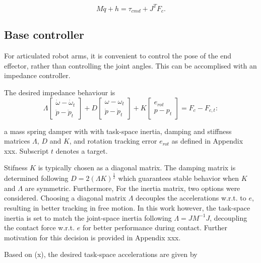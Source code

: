 \documentclass[a4paper, 10pt, conference]{ieeeconf}
\begin{document}
    \begin{equation}
    M\ddot{q}+h=\tau_{cmd}+J^TF_c.
    \end{equation}

    \subsection{Base controller}
    For articulated robot arms, it is convenient to control the pose of the end effector, rather than controlling the joint angles. This can be accomplised with an impedance controller.

    The desired impedance behaviour is
    \begin{equation}
     \Lambda \begin{bmatrix} \dot{\omega} - \dot{\omega}_{t} \\ \ddot{p} - \ddot{p}_{t} \end{bmatrix} + D \begin{bmatrix} {\omega} - {\omega}_{t} \\ \dot{p} - \dot{p}_{t} \end{bmatrix}  + K \begin{bmatrix} e_{rot} \\ {p} - {p}_{t} \end{bmatrix} = F_c-F_{c,t}:
     \end{equation} 

    a mass spring damper with with task-space inertia, damping and stiffness matrices $\Lambda$, $D$ and $K$, and rotation tracking error $e_{rot}$ as defined in Appendix xxx. Subscript $t$ denotes a target.

    Stifness $K$ is typically chosen as a diagonal matrix. The damping matrix is determined following $D = 2(\Lambda K)^{\frac{1}{2}}$ which guarantees stable behavior when $K$ and $\Lambda$ are symmetric. Furthermore, For the inertia matrix, two options were considered. Choosing a diagonal matrix $\Lambda$ decouples the accelerations w.r.t. to $e$, resulting in better tracking in free motion. In this work however, the task-space inertia is set to match the joint-space inertia following $\Lambda = JM^{-1}J$, decoupling the contact force w.r.t. $e$ for better performance during contact. Further motivation for this decision is provided in Appendix xxx. %

    Based on (x), the desired task-space accelerations are given by
    
\end{document}
